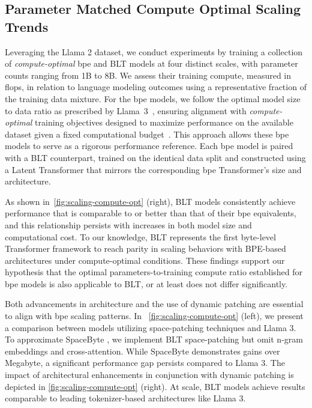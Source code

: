 \subsection{Parameter Matched Compute Optimal Scaling Trends}
\label{section:parameter-matched-scaling}
Leveraging the Llama 2 dataset, we conduct experiments by training a collection of \textit{compute-optimal} bpe and {\textsc BLT} models at four distinct scales, with parameter counts ranging from 1B to 8B. We assess their training compute, measured in flops, in relation to language modeling outcomes using a representative fraction of the training data mixture. For the bpe models, we follow the optimal model size to data ratio as prescribed by Llama~3~\citep{dubey2024llama}, ensuring alignment with \textit{compute-optimal} training objectives designed to maximize performance on the available dataset given a fixed computational budget~\citep{hoffmann2022training}. This approach allows these bpe models to serve as a rigorous performance reference. Each bpe model is paired with a {\textsc BLT} counterpart, trained on the identical data split and constructed using a Latent Transformer that mirrors the corresponding bpe Transformer's size and architecture.

As shown in~\autoref{fig:scaling-compute-opt} (right), {\textsc BLT} models consistently achieve performance that is comparable to or better than that of their bpe equivalents, and this relationship persists with increases in both model size and computational cost. To our knowledge, {\textsc BLT} represents the first byte-level Transformer framework to reach parity in scaling behaviors with BPE-based architectures under compute-optimal conditions. These findings support our hypothesis that the optimal parameters-to-training compute ratio established for bpe models is also applicable to {\textsc BLT}, or at least does not differ significantly.

Both advancements in architecture and the use of dynamic patching are essential to align with bpe scaling patterns. In ~\autoref{fig:scaling-compute-opt} (left), we present a comparison between models utilizing space-patching techniques and Llama 3. To approximate SpaceByte \citep{slagle2024spacebyte}, we implement {\textsc BLT} space-patching but omit n-gram embeddings and cross-attention. While SpaceByte demonstrates gains over Megabyte, a significant performance gap persists compared to Llama 3. The impact of architectural enhancements in conjunction with dynamic patching is depicted in \autoref{fig:scaling-compute-opt} (right). At scale, {\textsc BLT} models achieve results comparable to leading tokenizer-based architectures like Llama 3.

